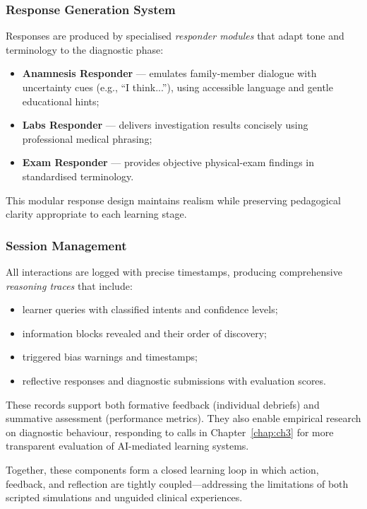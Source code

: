 \subsubsection{Response Generation System}

Responses are produced by specialised \textit{responder modules} that adapt tone
and terminology to the diagnostic phase:

\begin{itemize}
  \item \textbf{Anamnesis Responder} — emulates family-member dialogue with
  uncertainty cues (e.g., ``I think...''), using accessible language and gentle
  educational hints;
  \item \textbf{Labs Responder} — delivers investigation results concisely using
  professional medical phrasing;
  \item \textbf{Exam Responder} — provides objective physical-exam findings in
  standardised terminology.
\end{itemize}

This modular response design maintains realism while preserving pedagogical
clarity appropriate to each learning stage.

\subsubsection{Session Management}

All interactions are logged with precise timestamps, producing comprehensive
\textit{reasoning traces} that include:

\begin{itemize}
  \item learner queries with classified intents and confidence levels;
  \item information blocks revealed and their order of discovery;
  \item triggered bias warnings and timestamps;
  \item reflective responses and diagnostic submissions with evaluation scores.
\end{itemize}

These records support both formative feedback (individual debriefs) and summative
assessment (performance metrics).
They also enable empirical research on diagnostic behaviour, responding to calls
in Chapter~\ref{chap:ch3} for more transparent evaluation of AI-mediated learning
systems.

\medskip
Together, these components form a closed learning loop in which action, feedback,
and reflection are tightly coupled—addressing the limitations of both scripted
simulations and unguided clinical experiences.

